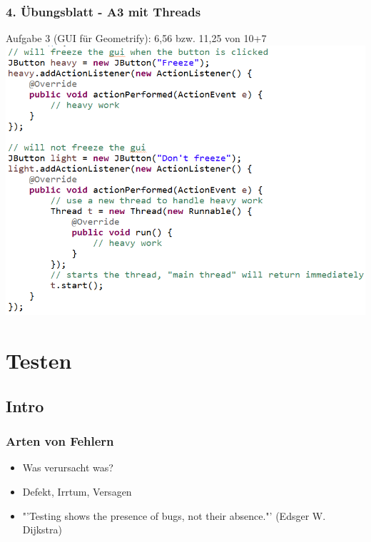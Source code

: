 \documentclass[18pt]{beamer}
\begin{document}
	\begin{frame}
		\frametitle{4. Übungsblatt - A3 mit Threads}
		\begin{block}{Aufgabe 3 (GUI für Geometrify): 6,56 bzw. 11,25 von 10+7} 
			\centering
			\includegraphics[scale=0.34]{./pics/tut5/extra-thread.png}
		\end{block}
	\end{frame}

\section{Testen}
	\subsection{Intro}
	
	\begin{frame}
		\frametitle{Arten von Fehlern}
		\begin{itemize}
			\item Was verursacht was?
			\item Defekt, Irrtum, Versagen \pause
			\item "'Testing shows the presence of bugs, not their absence."' (Edsger W. Dijkstra)
		\end{itemize}
	\end{frame}
\end{document}
